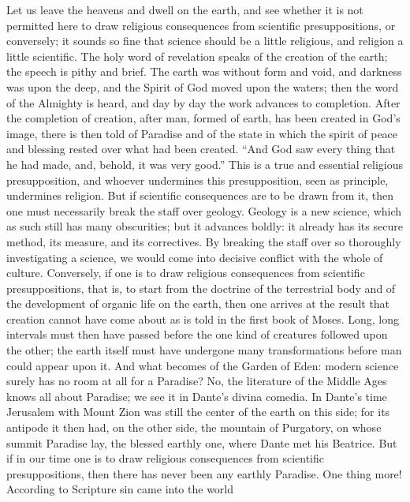 \documentclass[12pt]{book}
\newcommand{\opage}[1]{\marginnote{\footnotesize\textit{[#1]}}}
\begin{document}
Let us leave the heavens and dwell on the earth, and see whether it is
not permitted here to draw religious consequences from scientific
presuppositions, or conversely; it sounds so fine that science should be
a little religious, and religion a little scientific. The holy word of
revelation speaks of the creation of the earth; the speech is pithy and
brief. The earth was without form and void, and darkness was upon the
deep, and the Spirit of God moved upon the waters; then the word of the
Almighty is heard, and day by day the work advances to completion. After
the completion of creation, after man, formed of earth, has been created
in God's image, there is then told of Paradise and of the state in which
the spirit of peace and blessing rested over what had been created.
``And God saw every thing that he had made, and, behold, it was very
good.'' This is a true and essential religious presupposition, and
whoever undermines this presupposition, seen as principle, undermines
religion.
\opage{69}\setcounter{footnote}{0}%
But if scientific consequences are to be drawn from it, then one must
necessarily break the staff over geology. Geology is a new science,
which as such still has many obscurities; but it advances boldly: it
already has its secure method, its measure, and its correctives. By
breaking the staff over so thoroughly investigating a science, we would
come into decisive conflict with the whole of culture. Conversely, if
one is to draw religious consequences from scientific presuppositions,
that is, to start from the doctrine of the terrestrial body and of the
development of organic life on the earth, then one arrives at the result
that creation cannot have come about as is told in the first book of
Moses. Long, long intervals must then have passed before the one kind of
creatures followed upon the other; the earth itself must have undergone
many transformations before man could appear upon it. And what becomes
of the Garden of Eden: modern science surely has no room at all for a
Paradise? No, the literature of the Middle Ages knows all about
Paradise; we see it in Dante's divina comedia. In Dante's time Jerusalem
with Mount Zion was still the center of the earth on this side; for its
antipode it then had, on the other side, the mountain of Purgatory, on
whose summit Paradise lay, the blessed earthly one, where Dante met his
Beatrice. But if in our time one is to draw religious consequences from
scientific presuppositions, then there has never been any earthly
Paradise. One thing more! According to Scripture sin came into the world
\end{document}
